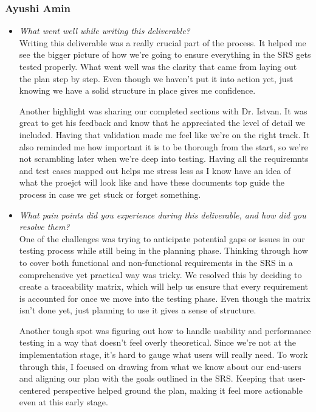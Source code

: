 \documentclass[12pt, titlepage]{article}
\begin{document}
\begin{enumerate}[label={\bf \textcolor{Maroon}{test-SRT-\arabic*}}, wide=0pt, font=\itshape]
\begin{appendices}
\begin{itemize}
\end{itemize}

\subsubsection*{Ayushi Amin}
\begin{itemize}
  \item \textit{What went well while writing this deliverable?} \\ 

  Writing this deliverable was a really crucial part of the process. It 
  helped me see the bigger picture of how we’re going to ensure everything 
  in the SRS gets tested properly. What went well was the clarity that came 
  from laying out the plan step by step. Even though we haven’t put it into 
  action yet, just knowing we have a solid structure in place gives me confidence.
  
  Another highlight was sharing our completed sections with Dr. Istvan. It 
  was great to get his feedback and know that he appreciated the level of 
  detail we included. Having that validation made me feel like we’re on the 
  right track. It also reminded me how important it is to be thorough from 
  the start, so we’re not scrambling later when we’re deep into testing.
  Having all the requiremnts and test cases mapped out helps me stress less
  as I know have an idea of what the proejct will look like and have these 
  documents top guide the process in case we get stuck or forget something.

  \item \textit{What pain points did you experience during this deliverable, and how did you resolve them?}\\ 
  
  One of the challenges was trying to anticipate potential gaps or issues 
  in our testing process while still being in the planning phase. Thinking 
  through how to cover both functional and non-functional requirements in
  the SRS in a comprehensive yet practical way was tricky. We resolved this
  by deciding to create a traceability matrix, which will help us ensure that 
  every requirement is accounted for once we move into the testing phase. Even 
  though the matrix isn’t done yet, just planning to use it gives a sense 
  of structure. 

  Another tough spot was figuring out how to handle usability and performance 
  testing in a way that doesn’t feel overly theoretical. Since we’re not at the 
  implementation stage, it’s hard to gauge what users will really need. To work 
  through this, I focused on drawing from what we know about our end-users and 
  aligning our plan with the goals outlined in the SRS. Keeping that user-centered 
  perspective helped ground the plan, making it feel more actionable even at this 
  early stage.
\end{itemize}


\end{appendices}
\end{enumerate}
\end{document}
